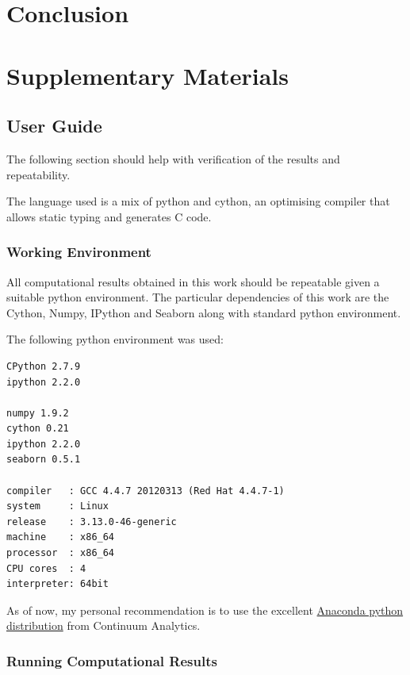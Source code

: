 \documentclass{article} %
\begin{document}
\section{Conclusion}








\newpage
\section{Supplementary Materials}

\subsection{User Guide}
\label{user_guide}

The following section should help with verification of the results and repeatability.\newline

The language used is a mix of python and cython, an optimising compiler that allows static typing and generates C code.


\subsubsection{Working Environment}
All computational results obtained in this work should be repeatable given a suitable python environment. The particular dependencies of this work are the Cython, Numpy, IPython and Seaborn along with standard python environment.\newline

The following python environment was used:

\begin{verbatim}
CPython 2.7.9
ipython 2.2.0

numpy 1.9.2
cython 0.21
ipython 2.2.0
seaborn 0.5.1

compiler   : GCC 4.4.7 20120313 (Red Hat 4.4.7-1)
system     : Linux
release    : 3.13.0-46-generic
machine    : x86_64
processor  : x86_64
CPU cores  : 4
interpreter: 64bit

\end{verbatim}

As of now, my personal recommendation is to use the excellent \href{http://continuum.io/downloads}{Anaconda python distribution} from Continuum Analytics.


\subsubsection{Running Computational Results}
\end{document}
